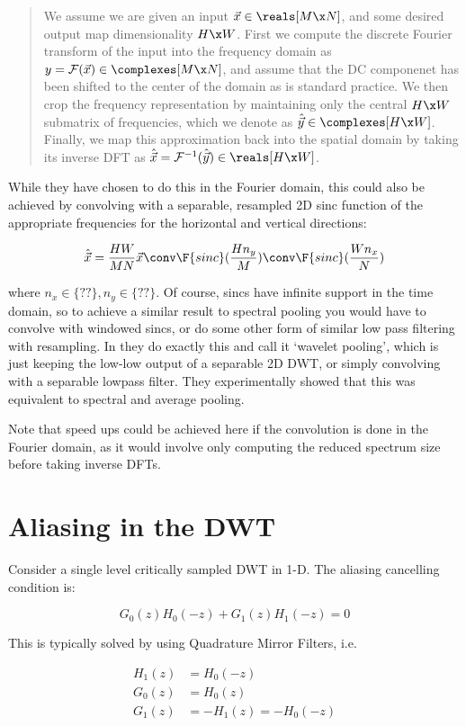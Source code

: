 \begin{quote}
  We assume we are given an input $\vec{x}\in \reals[M\x N]$, and some desired
  output map dimensionality $H \x W$. First we compute the discrete Fourier
  transform of the input into the frequency domain as $y = \mathcal{F}(\vec{x})
  \in \complexes[M\x N]$, and assume that the DC componenet has been shifted to
  the center of the domain as is standard practice. We then crop the frequency
  representation by maintaining only the central $H\x W$ submatrix of
  frequencies, which we denote as $\hat{\vec{y}} \in \complexes[H\x W]$. Finally, we
  map this approximation back into the spatial domain by taking its inverse DFT
  as $\hat{\vec{x}} = \mathcal{F}^{-1}(\hat{\vec{y}}) \in \reals[H\x W]$.
\end{quote}

While they have chosen to do this in the Fourier domain, this could also be
achieved by convolving with a separable, resampled 2D sinc function of the
appropriate frequencies for the horizontal and vertical directions:

$$\hat{\vec{x}} = \frac{HW}{MN} \vec{x} \conv \F{sinc}(\frac{Hn_y}{M}) \conv
\F{sinc}(\frac{Wn_x}{N})$$

where $n_x \in \{??\}, n_y \in \{??\}$. Of course, sincs have infinite support
in the time domain, so to achieve a similar result to spectral pooling you would
have to convolve with windowed sincs, or do some other form of similar low pass
filtering with resampling. In \cite{williams_wavelet_2018} they do exactly this
and call it `wavelet pooling', which is just keeping the low-low output of a
separable 2D DWT, or simply convolving with a separable lowpass filter. They
experimentally showed that this was equivalent to spectral and average pooling.

Note that speed ups could be achieved here if the convolution is done in the
Fourier domain, as it would involve only computing the reduced spectrum size
before taking inverse DFTs.


\section{Aliasing in the DWT}
Consider a single level critically sampled DWT in 1-D. The aliasing cancelling
condition is:

$$G_0(z)H_0(-z) + G_1(z)H_1(-z) = 0$$

This is typically solved by using Quadrature Mirror Filters, i.e.

\begin{align}
  H_1(z) &= H_0(-z) \\
  G_0(z) &= H_0(z) \\
  G_1(z) &= -H_1(z) = -H_0(-z) 
\end{align}


